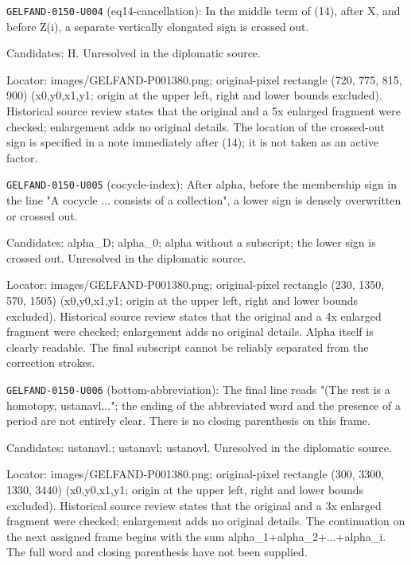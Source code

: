 \noindent\texttt{GELFAND-0150-U004} (eq14-cancellation): In the middle term of (14), after X, and before Z(i), a separate vertically elongated sign is crossed out.\par
Candidates: H. Unresolved in the diplomatic source.\par
Locator: images/GELFAND-P001380.png; original-pixel rectangle (720, 775, 815, 900) (x0,y0,x1,y1; origin at the upper left, right and lower bounds excluded). Historical source review states that the original and a 5x enlarged fragment were checked; enlargement adds no original details. The location of the crossed-out sign is specified in a note immediately after (14); it is not taken as an active factor.\par

\noindent\texttt{GELFAND-0150-U005} (cocycle-index): After alpha, before the membership sign in the line "A cocycle ... consists of a collection", a lower sign is densely overwritten or crossed out.\par
Candidates: alpha\_D; alpha\_0; alpha without a subscript; the lower sign is crossed out. Unresolved in the diplomatic source.\par
Locator: images/GELFAND-P001380.png; original-pixel rectangle (230, 1350, 570, 1505) (x0,y0,x1,y1; origin at the upper left, right and lower bounds excluded). Historical source review states that the original and a 4x enlarged fragment were checked; enlargement adds no original details. Alpha itself is clearly readable. The final subscript cannot be reliably separated from the correction strokes.\par

\noindent\texttt{GELFAND-0150-U006} (bottom-abbreviation): The final line reads "(The rest is a homotopy, ustanavl..."; the ending of the abbreviated word and the presence of a period are not entirely clear. There is no closing parenthesis on this frame.\par
Candidates: ustanavl.; ustanavl; ustanovl. Unresolved in the diplomatic source.\par
Locator: images/GELFAND-P001380.png; original-pixel rectangle (300, 3300, 1330, 3440) (x0,y0,x1,y1; origin at the upper left, right and lower bounds excluded). Historical source review states that the original and a 3x enlarged fragment were checked; enlargement adds no original details. The continuation on the next assigned frame begins with the sum alpha\_1+alpha\_2+...+alpha\_i. The full word and closing parenthesis have not been supplied.\par

